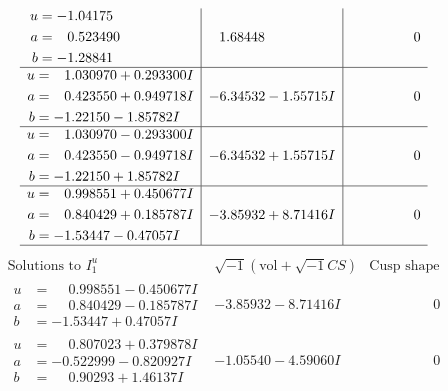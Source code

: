 \documentclass[1p]{elsarticle_modified}
\theoremstyle{definition}
\newcommand{\I}{\sqrt{-1}}
\begin{document}
$$\begin{array}{c|c|c}
\begin{aligned}
u &= -1.04175\phantom{ +0.000000I} \\
a &= \phantom{-}0.523490\phantom{ +0.000000I} \\
b &= -1.28841\phantom{ +0.000000I}\end{aligned}
 & \phantom{-}1.68448\phantom{ +0.000000I} & \phantom{-0.000000 } 0 \\ \hline\begin{aligned}
u &= \phantom{-}1.030970 + 0.293300 I \\
a &= \phantom{-}0.423550 + 0.949718 I \\
b &= -1.22150 - 1.85782 I\end{aligned}
 & -6.34532 - 1.55715 I & \phantom{-0.000000 } 0 \\ \hline\begin{aligned}
u &= \phantom{-}1.030970 - 0.293300 I \\
a &= \phantom{-}0.423550 - 0.949718 I \\
b &= -1.22150 + 1.85782 I\end{aligned}
 & -6.34532 + 1.55715 I & \phantom{-0.000000 } 0 \\ \hline\begin{aligned}
u &= \phantom{-}0.998551 + 0.450677 I \\
a &= \phantom{-}0.840429 + 0.185787 I \\
b &= -1.53447 - 0.47057 I\end{aligned}
 & -3.85932 + 8.71416 I & \phantom{-0.000000 } 0\\
 \hline 
 \end{array}$$\newpage$$\begin{array}{c|c|c}  
\text{Solutions to }I^u_{1}& \I (\text{vol} + \sqrt{-1}CS) & \text{Cusp shape}\\
 \hline 
\begin{aligned}
u &= \phantom{-}0.998551 - 0.450677 I \\
a &= \phantom{-}0.840429 - 0.185787 I \\
b &= -1.53447 + 0.47057 I\end{aligned}
 & -3.85932 - 8.71416 I & \phantom{-0.000000 } 0 \\ \hline\begin{aligned}
u &= \phantom{-}0.807023 + 0.379878 I \\
a &= -0.522999 - 0.820927 I \\
b &= \phantom{-}0.90293 + 1.46137 I\end{aligned}
 & -1.05540 - 4.59060 I & \phantom{-0.000000 } 0 \\ \hline\begin{aligned}

\end{aligned}
\end{array}$$
\end{document}
